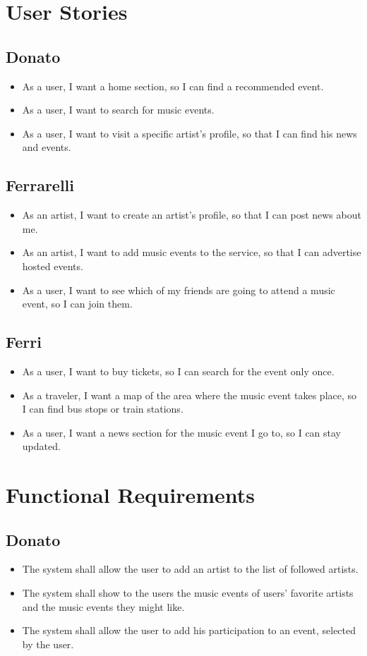 \documentclass[11pt,a4paper]{article}
\begin{document}
\section{User Stories}
\subsection{Donato}
\begin{itemize}
\item As a user, I want a home section, so I can find a recommended event. 
\item As a user, I want to search for music events.
\item As a user, I want to visit a specific artist’s profile, so that I can find his news and events.
\end{itemize}
\subsection{Ferrarelli}
\begin{itemize}
\item As an artist, I want to create an artist’s profile, so that I can post news about me.
\item As an artist, I want to add music events to the service, so that I can advertise hosted events.
\item As a user, I want to see which of my friends are going to attend a music event, so I can join them.
\end{itemize}
\subsection{Ferri}
\begin{itemize}
\item As a user, I want to buy tickets, so I can search for the event only once.
\item As a traveler, I want a map of the area where the music event takes place, so I can
find bus stops or train stations. 
\item As a user, I want a news section for the music event I go to, so I can stay updated.
\end{itemize}
\section{Functional Requirements}
\subsection{Donato}
\begin{itemize}
\item The system shall allow the user to add an artist to the list of followed artists.
\item The system shall show to the users the music events of users’ favorite artists and the music events they might like.
\item The system shall allow the user to add his participation to an event, selected by the user.
\end{itemize}
\end{document}
